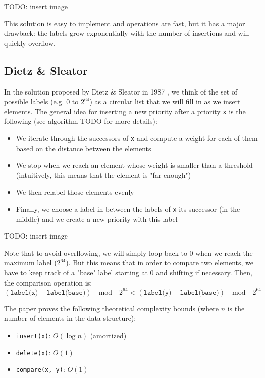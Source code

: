\documentclass[12pt]{article}
\begin{document}
TODO: insert image

This solution is easy to implement and operations are fast, but it has a major drawback: the labels grow exponentially with the number of insertions and will quickly overflow.

\subsection{Dietz \& Sleator}

In the solution proposed by Dietz \& Sleator in 1987 \cite{10.1145/28395.28434}, we think of the set of possible labels (e.g. $0$ to $2^{64}$) as a circular list that we will fill in as we insert elements.
The general idea for inserting a new priority after a priority \texttt{x} is the following (see algorithm TODO for more details):
\begin{itemize}
	\item We iterate through the successors of \texttt{x} and compute a weight for each of them based on the distance between the elements
	\item We stop when we reach an element whose weight is smaller than a threshold (intuitively, this means that the element is "far enough")
	\item We then relabel those elements evenly
	\item Finally, we choose a label in between the labels of \texttt{x} its successor (in the middle) and we create a new priority with this label
\end{itemize}

TODO: insert image

Note that to avoid overflowing, we will simply loop back to 0 when we reach the maximum label ($2^{64}$).
But this means that in order to compare two elements, we have to keep track of a "base" label starting at 0 and shifting if necessary.
Then, the comparison operation is:
$$ (\texttt{label(x)} - \texttt{label(base)}) \quad \text{mod} \quad 2^{64} < (\texttt{label(y)} - \texttt{label(base)}) \quad \text{mod} \quad 2^{64} $$

The paper proves the following theoretical complexity bounds (where $n$ is the number of elements in the data structure):
\begin{itemize}
	\item \texttt{insert(x)}: $O(\log n)$ (amortized)
	\item \texttt{delete(x)}: $O(1)$
	\item \texttt{compare(x, y)}: $O(1)$
\end{itemize}
\end{document}
